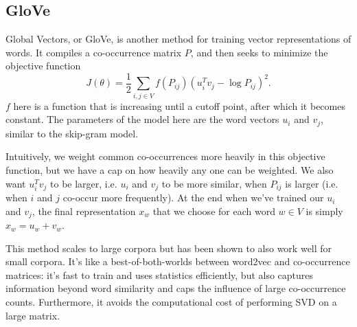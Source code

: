 \subsection{GloVe}
Global Vectors, or GloVe, is another method for training vector representations of words. It compiles a co-occurrence matrix $P$, and then seeks to minimize the objective function
$$J(\theta) = \frac{1}{2} \sum_{i, j \in V}f(P_{ij})\left(u_i^T v_j - \log P_{ij}\right)^2.$$
$f$ here is a function that is increasing until a cutoff point, after which it becomes constant. The parameters of the model here are the word vectors $u_i$ and $v_j$, similar to the skip-gram model.

Intuitively, we weight common co-occurrences more heavily in this objective function, but we have a cap on how heavily any one can be weighted. We also want $u_i^T v_j$ to be larger, i.e. $u_i$ and $v_j$ to be more similar, when $P_{ij}$ is larger (i.e. when $i$ and $j$ co-occur more frequently). At the end when we've trained our $u_i$ and $v_j$, the final representation $x_w$ that we choose for each word $w \in V$ is simply $x_w = u_w + v_w$.

This method scales to large corpora but has been shown to also work well for small corpora. It's like a best-of-both-worlds between word2vec and co-occurrence matrices: it's fast to train and uses statistics efficiently, but also captures information beyond word similarity and caps the influence of large co-occurrence counts. Furthermore, it avoids the computational cost of performing SVD on a large matrix.

